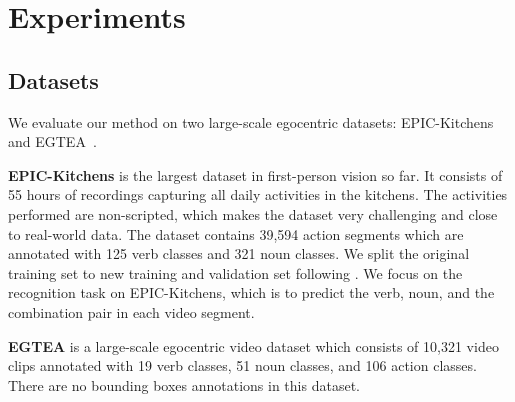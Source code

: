 \documentclass[letterpaper]{article} \usepackage{aaai20}  \usepackage{times}  \usepackage{helvet} \usepackage{courier}  \usepackage[hyphens]{url}  \usepackage{graphicx} \urlstyle{rm} \def\UrlFont{\rm}  \usepackage{graphicx}  \frenchspacing  \setlength{\pdfpagewidth}{8.5in}  \setlength{\pdfpageheight}{11in}  \usepackage{amsfonts,amssymb}
\begin{document}
\section{Experiments}

\subsection{Datasets}
We evaluate our method on two large-scale egocentric datasets: EPIC-Kitchens~\cite{Damen2018ScalingEV} and EGTEA~\cite{li2018eye}.

\textbf{EPIC-Kitchens} is the largest dataset in first-person vision so far. It consists of 55 hours of recordings capturing all daily activities in the kitchens. The activities performed are non-scripted, which makes the dataset very challenging and close to real-world data. The dataset contains 39,594 action segments which are annotated with 125 verb classes and 321 noun classes. We split the original training set to new training and validation set following \cite{Baradel2018ObjectLV}. We focus on the recognition task on EPIC-Kitchens, which is to predict the verb, noun, and the combination pair in each video segment.

\textbf{EGTEA} is a large-scale egocentric video dataset which consists of 10,321 video clips annotated with 19 verb classes, 51 noun classes, and 106 action classes. There are no bounding boxes annotations in this dataset. 
\end{document}
